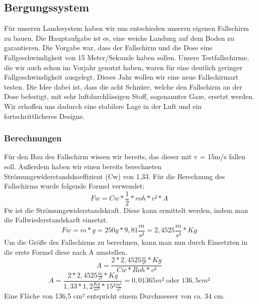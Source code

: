 \subsection{Bergungssystem}
Für unseren Landesystem haben wir uns entschieden unseren eigenen Fallschirm zu bauen. Die Hauptaufgabe ist es, eine weiche Landung auf dem Boden zu garantieren. Die Vorgabe war, dass der Fallschirm und die Dose eine Fallgeschwindigkeit von 15 Meter/Sekunde haben sollen. Unsere Testfallschirme, die wir auch schon im Vorjahr genutzt haben, waren für eine deutlich geringer Fallgeschwindigkeit ausgelegt. Dieses Jahr wollen wir eine neue Fallschirmart testen. Die Idee dabei ist, dass die acht Schnüre, welche den Fallschirm an der Dose befestigt, mit sehr luftdurchlässigen Stoff, sogenannter Gaze, ersetzt werden. Wir erhoffen uns dadurch eine stabilere Lage in der Luft und ein fortschrittlicheres Designe.

\subsubsection{Berechnungen}
Für den Bau des Fallschirm wissen wir bereits, das dieser mit v = 15m/s fallen soll. Außerdem haben wir einen bereits berechneten Strömungswiderstandskoeffizient (Cw) von 1,33. Für die Berechnung des Fallschirms wurde folgende Formel verwendet:
\[
Fw = Cw*\frac{1}{2}*roh*v²*A
\]
Fw ist die Strömungswiderstandskraft. Diese kann ermittelt werden, indem man die Fallwiederstandskarft einsetzt.
\[
Fw = m * g = 250g * 9,81\frac{m}{s²} = 2,4525\frac{m}{s²}*Kg
\]
Um die Größe des Fallschirms zu berechnen, kann man nun durch Einsetzten in die erste Formel diese nach A umstellen.
\[
A=\frac{2*2,4525\frac{m}{s²}*Kg}{Cw*Roh*v²}
\]
\[
A=\frac{2*2,4525\frac{m}{s²}*Kg}{1,33*1,2\frac{Kg}{m³}*15²\frac{m²}{s²}} = 0,01365m² \text{ oder } 136,5cm²
\]
Eine Fläche von 136,5 cm² entspricht einem Durchmesser von ca. 34 cm.

